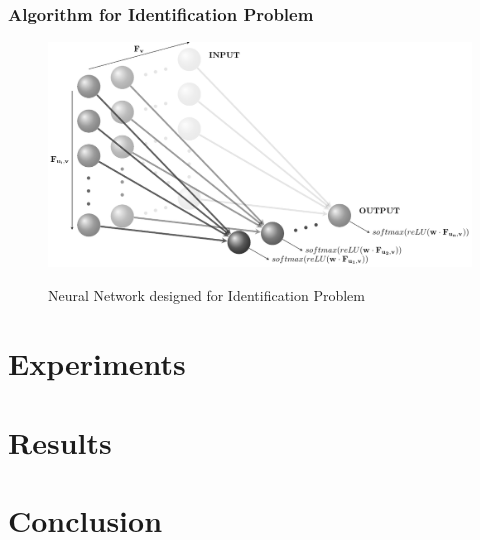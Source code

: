 \documentclass[12pt]{article}
\begin{document}
    
    \subsubsection{Algorithm for Identification Problem}
    \begin{figure}[H]
        \caption{Neural Network designed for Identification Problem}
        \centering
        \includegraphics[width=\textwidth]{weights_net}
        \label{fig:Neural Network designed for Identification Problem}
    \end{figure}
    \section{Experiments}
    
    \section{Results}
    \section{Conclusion}
    
    \blindtext
    
    
\end{document}
